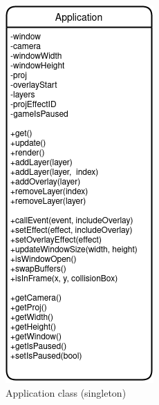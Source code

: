 \documentclass[../../Main.tex]{subfiles}
\begin{document}
    \begin{figure}[hbt!]
        \centerline{\includegraphics[scale=0.5]{img/Classes/Application.png}}
        \caption{Application class (singleton)}
        \label{fig}
    \end{figure}
\end{document}
